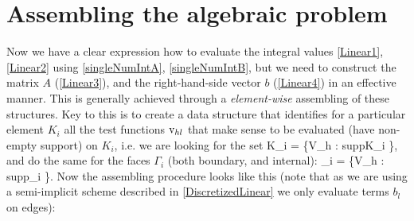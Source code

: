 \section{Assembling the algebraic problem}
Now we have a clear expression how to evaluate the integral values \ref{Linear1}, \ref{Linear2} using \ref{singleNumIntA}, \ref{singleNumIntB}, but we need to construct the matrix $A$ (\ref{Linear3}), and the right-hand-side vector $b$ (\ref{Linear4}) in an effective manner.
This is generally achieved through a \textit{element-wise} assembling of these structures. Key to this is to create a data structure that identifies for a particular element $K_i$ all the test functions $\mathrm{v}_{hl}$ that make sense to be evaluated (have non-empty support) on $K_i$, i.e. we are looking for the set
\be
\mrvh \lo K_i \ro = \left\{\mrvh \in V_h : supp\lo\mrvh\ro \cap K_i \neq \emptyset \right\},
\ee
and do the same for the faces $\Gamma_i$ (both boundary, and internal):
\be
\mrvh \lo \Gamma_i \ro = \left\{\mrvh \in V_h : supp\lo\mrvh\ro \cap \Gamma_i \neq \emptyset \right\}.
\ee
Now the assembling procedure looks like this (note that as we are using a semi-implicit scheme described in \ref{DiscretizedLinear} we only evaluate terms $b_l$ on edges):\\
